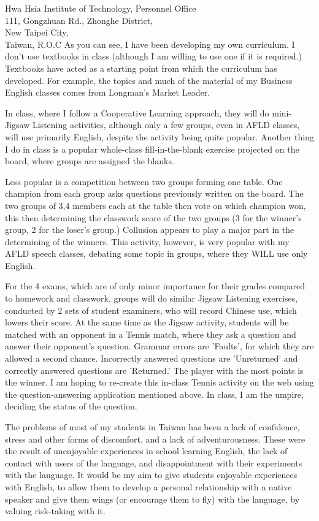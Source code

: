 \documentclass{letter}
\begin{document}
\begin{letter}{
Hwa Hsia Institute of Technology, Personnel Office \\ 111, Gongzhuan Rd., Zhonghe District, \\ New Taipei City, \\ Taiwan, R.O.C}
As you can see, I have been developing my own curriculum. I don't use textbooks in class (although I am willing to use one if it is required.) Textbooks have acted as a starting point from which the curriculum has developed. For example, the topics and much of the material of my Business English classes comes from Longman's Market Leader.
 
In class, where I follow a Cooperative Learning approach, they will do mini-Jigsaw Listening activities, although only a few groups, even in AFLD classes, will use primarily English, despite the activity being quite popular. Another thing I do in class is a popular whole-class fill-in-the-blank exercise projected on the board, where groups are assigned the blanks.

Less popular is a competition between two groups forming one table. One champion from each group asks questions previously written on the board. The two groups of 3,4 members each at the table then vote on which champion won, this then determining the classwork score of the two groups (3 for the winner's group, 2 for the loser's group.) Collusion appears to play a major part in the determining of the winners. This activity, however, is very popular with my AFLD speech classes, debating some topic in groups, where they WILL use only English.

For the 4 exams, which are of only minor importance for their grades compared to homework and classwork, groups will do similar Jigsaw Listening exercises, conducted by 2 sets of student examiners, who will record Chinese use, which lowers their score. At the same time as the Jigsaw activity, students will be matched with an opponent in a Tennis match, where they ask a question and answer their opponent's question. Grammar errors are 'Faults', for which they are allowed a second chance. Incorrectly answered questions are 'Unreturned' and correctly answered questions are 'Returned.' The player with the most points is the winner. I am hoping to re-create this in-class Tennis activity on the web using the question-answering application mentioned above. In class, I am the umpire, deciding the status of the question. 

The problems of most of my students in Taiwan has been a lack of confidence, stress and other forms of discomfort, and a lack of adventurousness. These were the result of unenjoyable experiences in school learning English, the lack of contact with users of the language, and disappointment with their experiments with the language. It would be my aim to give students enjoyable experiences with English, to allow them to develop a personal relationship with a native speaker and give them wings (or encourage them to fly) with the language, by valuing risk-taking with it. 


\end{letter}
\end{document}
